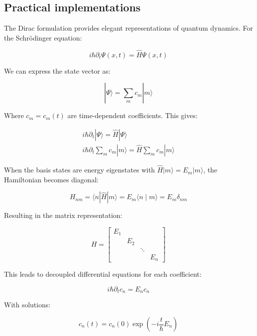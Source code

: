 \documentclass[italian]{HKNdocument}
\begin{document}
\subsection{Practical implementations}
The Dirac formulation provides elegant representations of quantum dynamics. For the Schrödinger equation:

\begin{equation}
i \hbar \partial_{t} \Psi(x, t)=\hat{H} \Psi(x, t)
\end{equation}

We can express the state vector as:

\begin{equation}
|\Psi\rangle=\sum_{m} c_{m}|m\rangle
\end{equation}

Where $c_{m}=c_{m}(t)$ are time-dependent coefficients. This gives:

\[
\begin{array}{r}
i \hbar \partial_{t}|\Psi\rangle=\hat{H}|\Psi\rangle \\
i \hbar \partial_{t} \sum_{m} c_{m}|m\rangle=\hat{H} \sum_{m} c_{m}|m\rangle
\end{array}
\]

When the basis states are energy eigenstates with $\hat{H}|m\rangle=E_{m}|m\rangle$, the Hamiltonian becomes diagonal:

\begin{equation}
H_{n m}=\langle n| \hat{H}|m\rangle=E_{m}\langle n \mid m\rangle=E_{m} \delta_{n m}
\end{equation}

Resulting in the matrix representation:

\[
H=\left[\begin{array}{llll}
E_{1} & & &  \\
& E_{2} & & \\
& & \ddots & \\
& & & E_{n}
\end{array}\right]
\]

This leads to decoupled differential equations for each coefficient:

\begin{equation}
i \hbar \partial_{t} c_{n}=E_{n} c_{n}
\end{equation}

With solutions:

\begin{equation}
c_{n}(t)=c_{n}(0) \exp \left(-i \frac{t}{\hbar} E_{n}\right)
\end{equation}
\end{document}
